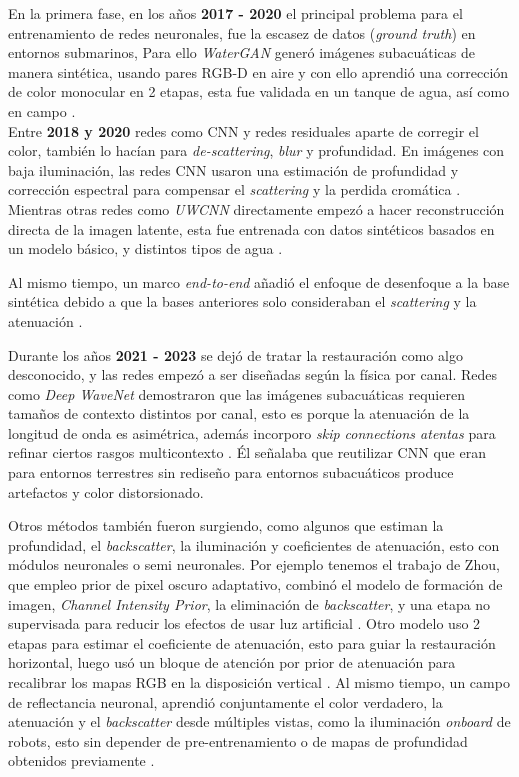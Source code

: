 \documentclass[12pt,letterpaper,spanish,twoside,openright]{report}
\begin{document}
En la primera fase, en los años \textbf{2017 - 2020} el principal problema para el entrenamiento de redes neuronales, fue la escasez de datos (\textit{ground truth}) en entornos submarinos, Para ello \textit{WaterGAN} generó imágenes subacuáticas de manera sintética, usando pares RGB-D en aire y con ello aprendió una corrección de color monocular en 2 etapas, esta fue validada en un tanque de agua, así como en campo \parencite{7995024}.\\

Entre \textbf{2018 y 2020} redes como CNN y redes residuales aparte de corregir el color, también lo hacían para \textit{de-scattering}, \textit{blur} y profundidad. En imágenes con baja iluminación, las redes CNN usaron una estimación de profundidad y corrección espectral para compensar el \textit{scattering} y la perdida cromática \parencite{LU2018142}. Mientras otras redes como \textit{UWCNN} directamente empezó a hacer reconstrucción directa de la imagen latente, esta fue entrenada con datos sintéticos basados en un modelo básico, y distintos tipos de agua \parencite{LI2020107038}.

Al mismo tiempo, un marco \textit{end-to-end} añadió el enfoque de desenfoque a la base sintética debido a que la bases anteriores solo consideraban el \textit{scattering} y la atenuación \parencite{9072473}.

Durante los años \textbf{2021 - 2023} se dejó de tratar la restauración como algo desconocido, y las redes empezó a ser diseñadas según la física por canal. Redes como \textit{Deep WaveNet} demostraron que las imágenes subacuáticas requieren tamaños de contexto distintos por canal, esto es porque la atenuación de la longitud de onda es asimétrica, además incorporo \textit{skip connections atentas} para refinar ciertos rasgos multicontexto \parencite{10.1145/3511021}. Él señalaba que reutilizar CNN que eran para entornos terrestres sin rediseño para entornos subacuáticos produce artefactos y color distorsionado.

Otros métodos también fueron surgiendo, como algunos que estiman la profundidad, el \textit{backscatter}, la iluminación y coeficientes de atenuación, esto con módulos neuronales o semi neuronales. Por ejemplo tenemos el trabajo de Zhou, que empleo prior de pixel oscuro adaptativo, combinó el modelo de formación de imagen, \textit{Channel Intensity Prior}, la eliminación de \textit{backscatter}, y una etapa no supervisada para reducir los efectos de usar luz artificial \parencite{Zhou2025}. Otro modelo uso 2 etapas para estimar el coeficiente de atenuación, esto para guiar la restauración horizontal, luego usó un bloque de atención por prior de atenuación para recalibrar los mapas RGB en la disposición vertical \parencite{9311705}. Al mismo tiempo, un campo de reflectancia neuronal, aprendió conjuntamente el color verdadero, la atenuación y el \textit{backscatter} desde múltiples vistas, como la iluminación \textit{onboard} de robots, esto sin depender de pre-entrenamiento o de mapas de profundidad obtenidos previamente \parencite{10225666}.
\end{document}
